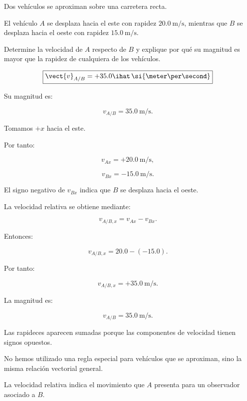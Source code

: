 \begin{ejercicio}
Dos vehículos se aproximan sobre una carretera recta.

El vehículo \(A\) se desplaza hacia el este con rapidez
\(\SI{20.0}{\meter\per\second}\), mientras que \(B\)
se desplaza hacia el oeste con rapidez
\(\SI{15.0}{\meter\per\second}\).

Determine la velocidad de \(A\) respecto de \(B\)
y explique por qué su magnitud es mayor que
la rapidez de cualquiera de los vehículos.
\end{ejercicio}

\begin{respuesta}
\[
\boxed{
\vect{v}_{A/B}
=
+35.0\ihat\,
\si{\meter\per\second}
}
\]

Su magnitud es:

\[
\boxed{
v_{A/B}
=
\SI{35.0}{\meter\per\second}
}.
\]
\end{respuesta}

\begin{explicacion}
Tomamos \(+x\) hacia el este.

Por tanto:

\[
v_{Ax}=+\SI{20.0}{\meter\per\second},
\]

\[
v_{Bx}=-\SI{15.0}{\meter\per\second}.
\]

El signo negativo de \(v_{Bx}\) indica que \(B\)
se desplaza hacia el oeste.

La velocidad relativa se obtiene mediante:

\[
v_{A/B,x}=v_{Ax}-v_{Bx}.
\]

Entonces:

\[
v_{A/B,x}=20.0-(-15.0).
\]

Por tanto:

\[
\boxed{
v_{A/B,x}
=
+\SI{35.0}{\meter\per\second}
}.
\]

La magnitud es:

\[
\boxed{
v_{A/B}
=
\SI{35.0}{\meter\per\second}
}.
\]

Las rapideces aparecen sumadas porque las componentes
de velocidad tienen signos opuestos.

No hemos utilizado una regla especial para vehículos
que se aproximan, sino la misma relación vectorial
general.

La velocidad relativa indica el movimiento que
\(A\) presenta para un observador asociado a \(B\).
\end{explicacion}


